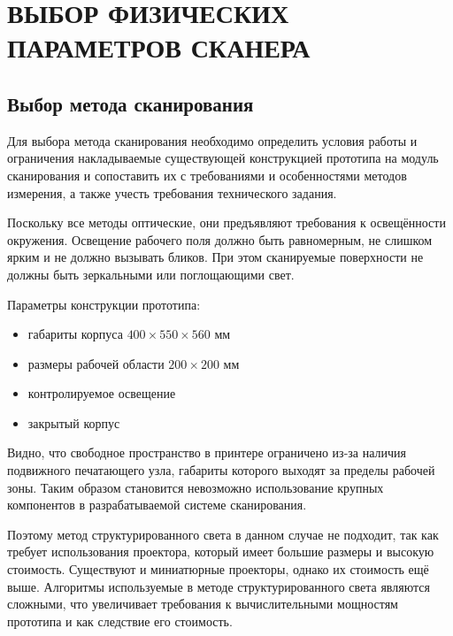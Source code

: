 \chapter{ВЫБОР ФИЗИЧЕСКИХ ПАРАМЕТРОВ СКАНЕРА}
    \section{Выбор метода сканирования}
        Для выбора метода сканирования необходимо определить условия работы и ограничения накладываемые существующей конструкцией прототипа на модуль сканирования и сопоставить их с требованиями и особенностями методов измерения, а также учесть требования технического задания.
        
        Поскольку все методы оптические, они предъявляют требования к освещённости окружения. Освещение рабочего поля должно быть равномерным, не слишком ярким и не должно вызывать бликов. При этом сканируемые поверхности не должны быть зеркальными или поглощающими свет.
        
        Параметры конструкции прототипа:
        \begin{itemize}
            \item габариты корпуса $ 400 \times 550 \times 560 \text{ мм} $
            \item размеры рабочей области $ 200 \times 200 \text{ мм} $
            \item контролируемое освещение
            \item закрытый корпус
        \end{itemize}
        
        Видно, что свободное пространство в принтере ограничено из-за наличия подвижного печатающего узла, габариты которого выходят за пределы рабочей зоны. Таким образом становится невозможно использование крупных компонентов в разрабатываемой системе сканирования.

        Поэтому метод структурированного света в данном случае не подходит, так как требует использования проектора, который имеет большие размеры и высокую стоимость. Существуют и миниатюрные проекторы, однако их стоимость ещё выше. Алгоритмы используемые в методе структурированного света являются сложными, что увеличивает требования к вычислительными мощностям прототипа и как следствие его стоимость.

